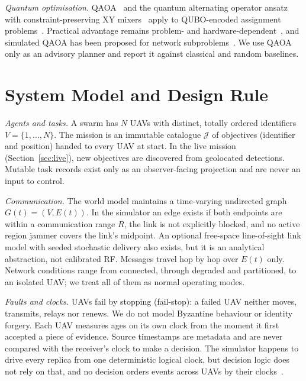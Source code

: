 \documentclass[conference]{IEEEtran}
\begin{document}
\emph{Quantum optimisation.} QAOA~\cite{farhi2014qaoa} and the quantum
alternating operator ansatz with constraint-preserving XY
mixers~\cite{hadfield2019qaoa,wang2020xy} apply to QUBO-encoded assignment
problems~\cite{lucas2014ising}. Practical advantage remains problem- and
hardware-dependent~\cite{blekos2024qaoa}, and simulated QAOA has been proposed
for network subproblems~\cite{chen2025distributedqc}. We use QAOA only as an
advisory planner and report it against classical and random baselines.

\section{System Model and Design Rule}
\label{sec:model}

\emph{Agents and tasks.} A swarm has $N$ UAVs with distinct, totally ordered
identifiers $V=\{1,\dots,N\}$. The mission is an immutable catalogue
$\mathcal{J}$ of objectives (identifier and position) handed to every UAV at
start. In the live mission (Section~\ref{sec:live}), new objectives are
discovered from geolocated detections. Mutable task records exist only as an
observer-facing projection and are never an input to control.

\emph{Communication.} The world model maintains a time-varying undirected
graph $G(t)=(V,E(t))$. In the simulator an edge exists if both endpoints are
within a communication range $R$, the link is not explicitly blocked, and no
active region jammer covers the link's midpoint. An optional free-space
line-of-sight link model with seeded stochastic delivery also exists, but it
is an analytical abstraction, not calibrated RF. Messages travel hop by hop
over $E(t)$ only. Network conditions range from connected, through degraded
and partitioned, to an isolated UAV; we treat all of them as normal operating
modes.

\emph{Faults and clocks.} UAVs fail by stopping (fail-stop): a failed UAV
neither moves, transmits, relays nor renews. We do not model Byzantine
behaviour or identity forgery. Each UAV measures ages on its own clock from
the moment it first accepted a piece of evidence. Source timestamps are
metadata and are never compared with the receiver's clock to make a decision.
The simulator happens to drive every replica from one deterministic logical
clock, but decision logic does not rely on that, and no decision orders events
across UAVs by their clocks~\cite{lamport1978time}.
\end{document}
